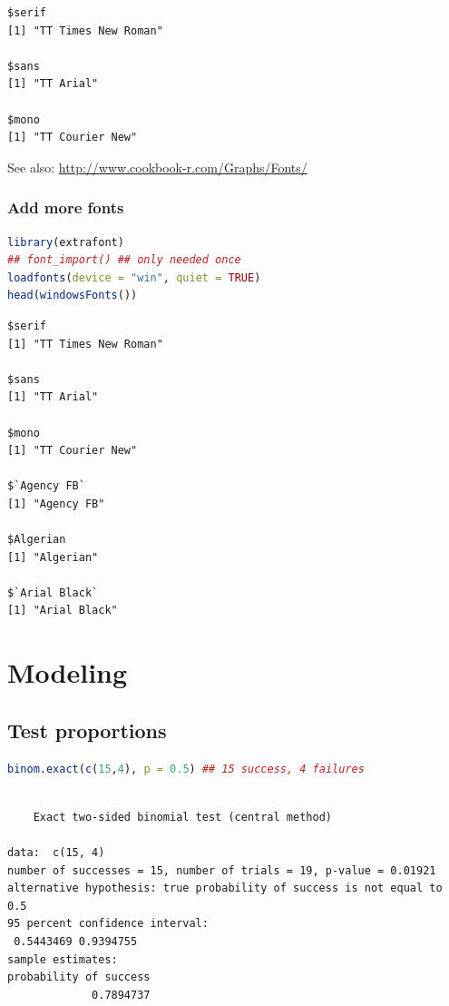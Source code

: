 \documentclass{article}
\begin{document}
\label{}
\begin{verbatim}
$serif
[1] "TT Times New Roman"

$sans
[1] "TT Arial"

$mono
[1] "TT Courier New"
\end{verbatim}


See also: \url{http://www.cookbook-r.com/Graphs/Fonts/}
\subsubsection{Add more fonts}
\label{sec:org185f39f}
\begin{lstlisting}[language=r,numbers=none]
library(extrafont)
## font_import() ## only needed once
loadfonts(device = "win", quiet = TRUE)
head(windowsFonts())
\end{lstlisting}

\label{}
\begin{verbatim}
$serif
[1] "TT Times New Roman"

$sans
[1] "TT Arial"

$mono
[1] "TT Courier New"

$`Agency FB`
[1] "Agency FB"

$Algerian
[1] "Algerian"

$`Arial Black`
[1] "Arial Black"
\end{verbatim}
\section{Modeling}
\label{sec:orga76301a}
\subsection{Test proportions}
\label{sec:orgefcb7a5}
\begin{lstlisting}[language=r,numbers=none]
binom.exact(c(15,4), p = 0.5) ## 15 success, 4 failures
\end{lstlisting}

\label{}
\begin{verbatim}

	Exact two-sided binomial test (central method)

data:  c(15, 4)
number of successes = 15, number of trials = 19, p-value = 0.01921
alternative hypothesis: true probability of success is not equal to 0.5
95 percent confidence interval:
 0.5443469 0.9394755
sample estimates:
probability of success 
             0.7894737
\end{verbatim}
\end{document}
